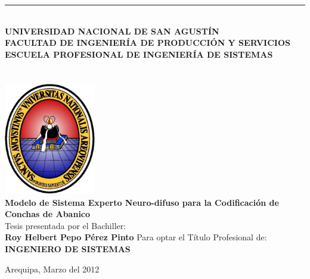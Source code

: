 \documentclass[12pt,oneside,a4paper]{book}
\begin{document}
\frontmatter 

\onehalfspacing  %

\thispagestyle{empty}
\begin{center}
  
\rule{\textwidth}{8pt} \\
\Large{\textbf{UNIVERSIDAD NACIONAL DE SAN AGUSTÍN}} \\
\large{\textbf{FACULTAD DE INGENIERÍA DE PRODUCCIÓN Y SERVICIOS}} \\
\large{\textbf{ESCUELA PROFESIONAL DE INGENIERÍA DE SISTEMAS}}\\~\\~\\
  
    \includegraphics[width=0.3\textwidth]{esc_color.pdf} \\
    \vspace*{1.6cm}
     \textbf{\Large{Modelo de Sistema Experto Neuro-difuso para la Codificación de Conchas de Abanico}}\\
     \vspace*{1.2cm}
     \Large{Tesis presentada por el Bachiller:\\}
     \Large{\textbf{Roy Helbert Pepo Pérez Pinto}}
%    
     \vskip 1cm
     \Large{Para optar el Título Profesional de:}\\
     \LARGE{\textbf{INGENIERO DE SISTEMAS}}
    \vskip 1cm
% 
   \vskip 0.5cm
    
    \vskip 0.3cm
    \normalsize{Arequipa, Marzo del 2012}
\end{center}
\end{document}
